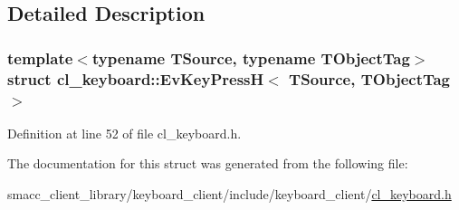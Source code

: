 \subsection{Detailed Description}
\subsubsection*{template$<$typename T\+Source, typename T\+Object\+Tag$>$\newline
struct cl\+\_\+keyboard\+::\+Ev\+Key\+Press\+H$<$ T\+Source, T\+Object\+Tag $>$}



Definition at line 52 of file cl\+\_\+keyboard.\+h.



The documentation for this struct was generated from the following file\+:\begin{DoxyCompactItemize}
\item 
smacc\+\_\+client\+\_\+library/keyboard\+\_\+client/include/keyboard\+\_\+client/\hyperlink{cl__keyboard_8h}{cl\+\_\+keyboard.\+h}\end{DoxyCompactItemize}

